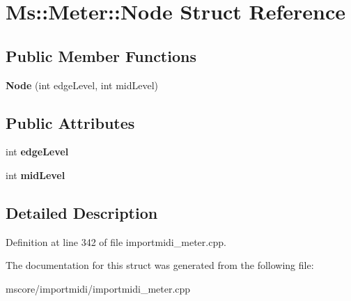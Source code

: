\hypertarget{struct_ms_1_1_meter_1_1_node}{}\section{Ms\+:\+:Meter\+:\+:Node Struct Reference}
\label{struct_ms_1_1_meter_1_1_node}
\subsection*{Public Member Functions}
\begin{DoxyCompactItemize}
\item 
\mbox{\label{struct_ms_1_1_meter_1_1_node_a69fb959aed6e09ab202c62a6d525e71b}} 
{\bfseries Node} (int edge\+Level, int mid\+Level)
\end{DoxyCompactItemize}
\subsection*{Public Attributes}
\begin{DoxyCompactItemize}
\item 
\mbox{\label{struct_ms_1_1_meter_1_1_node_a97ef932a4d9b8f7a363a371f4db10cc0}} 
int {\bfseries edge\+Level}
\item 
\mbox{\label{struct_ms_1_1_meter_1_1_node_ad73532c97c6ef00c269b0d884422ae6e}} 
int {\bfseries mid\+Level}
\end{DoxyCompactItemize}


\subsection{Detailed Description}


Definition at line 342 of file importmidi\+\_\+meter.\+cpp.



The documentation for this struct was generated from the following file\+:\begin{DoxyCompactItemize}
\item 
mscore/importmidi/importmidi\+\_\+meter.\+cpp\end{DoxyCompactItemize}

